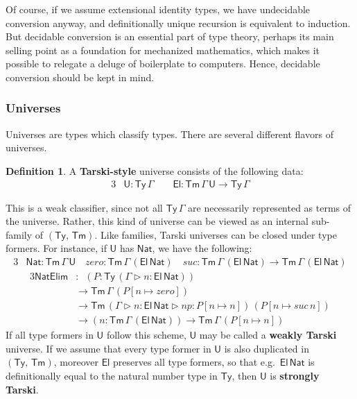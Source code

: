 \documentclass[12pt,a4paper,twoside,openany]{book}
\theoremstyle{remark}
\theoremstyle{definition}
\newtheorem{mydefinition}{Definition}
\theoremstyle{theorem}
\newcommand{\mi}[1]{\mathit{#1}}
\newcommand{\ms}[1]{\mathsf{#1}}
\newcommand{\Tm}{\mathsf{Tm}}
\newcommand{\Ty}{\mathsf{Ty}}
\newcommand{\U}{\mathsf{U}}
\newcommand{\El}{\mathsf{El}}
\newcommand{\ext}{\triangleright}
\newcommand{\Nat}{\ms{Nat}}
\begin{document}
Of course, if we assume extensional identity types, we have undecidable
conversion anyway, and definitionally unique recursion is equivalent to
induction. But decidable conversion is an essential part of type theory, perhaps
its main selling point as a foundation for mechanized mathematics, which makes
it possible to relegate a deluge of boilerplate to computers. Hence, decidable
conversion should be kept in mind.

\subsubsection{Universes}

Universes are types which classify types. There are several different flavors of
universes.

\begin{mydefinition} A \textbf{Tarski-style} universe consists of
the following data:
\begin{alignat*}{3}
  & \U : \Ty\,\Gamma\hspace{2em}\El : \Tm\,\Gamma\,\U \to \Ty\,\Gamma
\end{alignat*}
\end{mydefinition}
This is a weak classifier, since not all $\Ty\,\Gamma$ are necessarily
represented as terms of the universe. Rather, this kind of universe can be
viewed as an internal sub-family of $(\Ty,\,\Tm)$. Like families, Tarski
universes can be closed under type formers. For instance, if $\U$ has $\Nat$,
we have the following:
\begin{alignat*}{3}
  &\Nat : \Tm\,\Gamma\,\U
    \hspace{1em}\mi{zero} : \Tm\,\Gamma\,(\El\,\Nat)
    \hspace{1em}\mi{suc} : \Tm\,\Gamma\,(\El\,\Nat) \to \Tm\,\Gamma\,(\El\,\Nat)
\end{alignat*}
\vspace{-2em}
\begin{alignat*}{3}
  \ms{NatElim} &:\,\,\,(P : \Ty\,(\Gamma\ext n : \El\,\Nat))\\
  &\to \Tm\,\Gamma\,(P[n \mapsto \mi{zero}])\\
  &\to \Tm\,(\Gamma\ext n : \El\,\Nat \ext \mi{np} : P[n \mapsto n])\,(P[n \mapsto \mi{suc}\,n]) \\
  &\to (n : \Tm\,\Gamma\,(\El\,\Nat)) \to \Tm\,\Gamma\,(P[n \mapsto n])
\end{alignat*}
If all type formers in $\U$ follow this scheme, $\U$ may be called a
\textbf{weakly Tarski} universe. If we assume that every type former in $\U$ is
also duplicated in $(\Ty,\,\Tm)$, moreover $\El$ preserves all type formers, so
that e.g.\ $\El\,\Nat$ is definitionally equal to the natural number type in
$\Ty$, then $\U$ is \textbf{strongly Tarski}.
\end{document}
